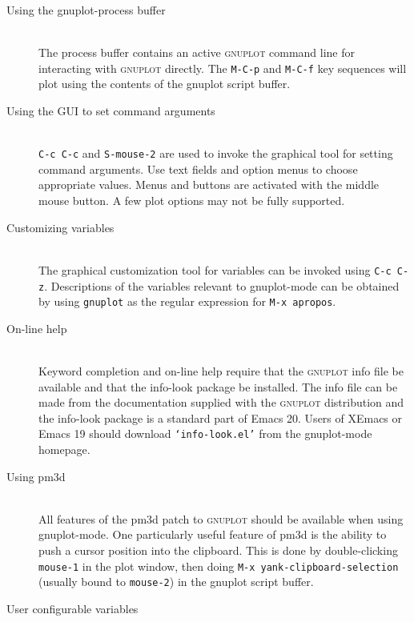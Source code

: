 \documentclass[twocolumn]{article}
\newenvironment{Boxedminipage}%
{\begin{Sbox}\begin{minipage}}%
  {\end{minipage}\end{Sbox}\Ovalbox{\TheSbox}}
\def\file#1{{\texttt{`#1'}}}
\begin{document}
\vspace{4ex}

\begin{description}
\item[Using the gnuplot-process buffer] \hfill \\
  The process buffer contains an active \textsc{gnuplot} command line
  for interacting with \textsc{gnuplot} directly.  The \texttt{M-C-p}
  and \texttt{M-C-f} key sequences will plot using the contents of
  the gnuplot script buffer.
\item[Using the GUI to set command arguments] \hfill \\
  \texttt{C-c C-c} and \texttt{S-mouse-2} are used to invoke the
  graphical tool for setting command arguments.  Use text fields and
  option menus to choose appropriate values.  Menus and buttons are
  activated with the middle mouse button.  A few plot options may not
  be fully supported.
\item[Customizing variables] \hfill \\
  The graphical customization tool for variables can be invoked using
  \texttt{C-c C-z}.  Descriptions of the variables relevant to
  gnuplot-mode can be obtained by using \texttt{gnuplot} as the
  regular expression for \texttt{M-x apropos}.
\item[On-line help] \hfill \\
  Keyword completion and on-line help require that the
  \textsc{gnuplot} info file be available and that the info-look
  package be installed.  The info file can be made from the
  documentation supplied with the \textsc{gnuplot} distribution and
  the info-look package is a standard part of Emacs 20.  Users of
  XEmacs or Emacs 19 should download \file{info-look.el} from the
  gnuplot-mode homepage.
\item[Using pm3d] \hfill \\
  All features of the pm3d patch to \textsc{gnuplot} should be
  available when using gnuplot-mode.  One particularly useful feature
  of pm3d is the ability to push a cursor position into the
  clipboard.  This is done by double-clicking \texttt{mouse-1} in the
  plot window, then doing \texttt{M-x yank-clipboard-selection}
  (usually bound to \texttt{mouse-2}) in the gnuplot script buffer.
\end{description}



\vfill
\pagebreak


\begin{center}
  \begin{Boxedminipage}{0.75\linewidth}
    \begin{center}
      {\large User configurable variables}
    \end{center}
  \end{Boxedminipage}
\end{center}
\end{document}
